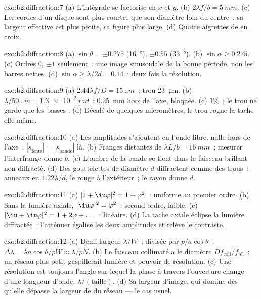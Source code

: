 \begin{solution}{exo:b2:diffraction:7}
(a) L'intégrale se factorise en $x$ et $y$. (b) $2\lambda f/b = \qty{5}{mm}$. (c) Les
cordes d'un disque sont plus courtes que son diamètre loin du centre~: sa
largeur effective est plus petite, sa figure plus large. (d) Quatre aigrettes
de  en croix.
\end{solution}

\begin{solution}{exo:b2:diffraction:8}
(a) $\sin\theta = \pm0.275$ (\qty{16}{\degree}), $\pm0.55$ (\qty{33}{\degree}). (b) $\sin\alpha \ge 0.275$.
(c) Ordres $0$, $\pm1$ seulement~: une image sinusoïdale de la bonne période, non
les barres nettes. (d) $\sin\alpha \ge \lambda/2d = 0.14$~: deux fois la résolution.
\end{solution}

\begin{solution}{exo:b2:diffraction:9}
(a) $2.44\lambda f/D = \qty{15}{\micro m}$~; trou \qty{23}{\micro m}. (b) $\lambda/\qty{50}{\micro m} =
\qty{1.3e-2}{rad}$~: \qty{0.25}{mm} hors de l'axe, bloquée. (c) $1\%$~; le trou ne garde que
les basses . (d) Décalé de quelques micromètres, le
trou rogne la tache elle-même.
\end{solution}

\begin{solution}{exo:b2:diffraction:10}
(a) Les amplitudes s'ajoutent en l'onde libre, nulle hors de l'axe~:
$|\underline s_{\text{fente}}| = |\underline s_{\text{bande}}|$ là. (b) Franges distantes de $\lambda L/b =
\qty{16}{mm}$~; mesurer l'interfrange donne $b$. (c) L'ombre de la bande se tient
dans le faisceau brillant non diffracté. (d) Des gouttelettes de diamètre $d$ diffractent
comme des trous~: anneaux en $1.22\lambda/d$, le rouge à l'extérieur~; le rayon donne $d$.
\end{solution}

\begin{solution}{exo:b2:diffraction:11}
(a) $|1 + \iu\varphi|^2 = 1 + \varphi^2$~: uniforme au premier ordre. (b) Sans la
lumière axiale, $|\iu\varphi|^2 = \varphi^2$~: second ordre, faible. (c) $|\iu + \iu\varphi|^2 =
1 + 2\varphi + \dots$~: linéaire. (d) La tache axiale éclipse la lumière
diffractée~; l'atténuer égalise les deux amplitudes et relève le contraste.
\end{solution}

\begin{solution}{exo:b2:diffraction:12}
(a) Demi-largeur $\lambda/W$~; divisée par $p/a\cos\theta$~: $\Delta\lambda = \lambda a\cos\theta/pW \approx
\lambda/pN$. (b) Le faisceau collimaté a le diamètre $Df_{\text{coll}}/f_{\text{tél}}$~;
un réseau plus petit gaspillerait lumière et pouvoir de résolution. (c) Une
résolution est toujours l'angle sur lequel la phase à travers
l'ouverture change d'une longueur d'onde, $\lambda/(\text{taille})$. (d) Sa largeur
d'image, qui domine dès qu'elle dépasse la largeur de  du
réseau --- le cas usuel.
\end{solution}

